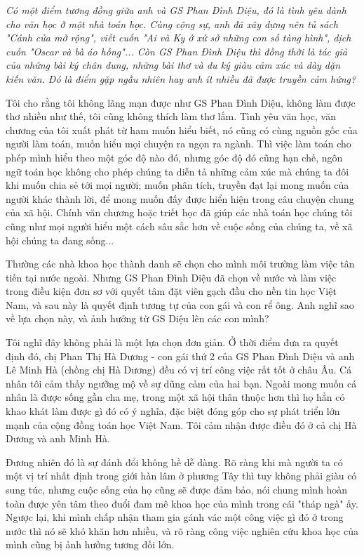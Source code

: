 \emph{
Có một điểm tương đồng giữa anh và GS Phan Đình Diệu, đó là tình yêu dành cho văn học ở một nhà toán học. Cùng cộng sự, anh đã xây dựng nên tủ sách "Cánh cửa mở rộng", viết cuốn "Ai và Ky ở xứ sở những con số tàng hình", dịch cuốn "Oscar và bà áo hồng"... Còn GS Phan Đình Diệu thì đồng thời là tác giả của những bài ký chân dung, những bài thơ và du ký giàu cảm xúc và dày dặn kiến văn. Đó là điểm gặp ngẫu nhiên hay anh ít nhiều đã được truyền cảm hứng?}

Tôi cho rằng tôi không lãng mạn được như GS Phan Đình Diệu, không làm được thơ nhiều như thế, tôi cũng không thích làm thơ lắm. Tình yêu văn học, văn chương của tôi xuất phát từ ham muốn hiểu biết, nó cũng có cùng nguồn gốc của người làm toán, muốn hiểu mọi chuyện ra ngọn ra ngành. Thì việc làm toán cho phép mình hiểu theo một góc độ nào đó, nhưng góc độ đó cũng hạn chế, ngôn ngữ toán học không cho phép chúng ta diễn tả những cảm xúc mà chúng ta đôi khi muốn chia sẻ tới mọi người; muốn phân tích, truyền đạt lại mong muốn của người khác thành lời, để mong muốn đấy được hiển hiện trong câu chuyện chung của xã hội. Chính văn chương hoặc triết học đã giúp các nhà toán học chúng tôi cũng như mọi người hiểu một cách sâu sắc hơn về cuộc sống của chúng ta, về xã hội chúng ta đang sống...

Thường các nhà khoa học thành danh sẽ chọn cho mình môi trường làm việc tân tiến tại nước ngoài. Nhưng GS Phan Đình Diệu đã chọn về nước và làm việc trong điều kiện đơn sơ với quyết tâm đặt viên gạch đầu cho nền tin học Việt Nam, và sau này là quyết định tương tự của con gái và con rể ông. Anh nghĩ sao về lựa chọn này, và ảnh hưởng từ GS Diệu lên các con mình?

Tôi nghĩ đây không phải là một lựa chọn đơn giản. Ở thời điểm đưa ra quyết định đó, chị Phan Thị Hà Dương - con gái thứ 2 của GS Phan Đình Diệu và anh Lê Minh Hà (chồng chị Hà Dương) đều có vị trí công việc rất tốt ở châu Âu. Cá nhân tôi cảm thấy ngưỡng mộ về sự dũng cảm của hai bạn. Ngoài mong muốn cá nhân là được sống gần cha mẹ, trong một xã hội thân thuộc hơn thì họ hẳn có khao khát làm được gì đó có ý nghĩa, đặc biệt đóng góp cho sự phát triển lớn mạnh của cộng đồng toán học Việt Nam. Tôi cảm nhận được điều đó ở cả chị Hà Dương và anh Minh Hà.       

Đương nhiên đó là sự đánh đổi không hề dễ dàng. Rõ ràng khi mà người ta có một vị trí nhất định trong giới hàn lâm ở phương Tây thì tuy không phải giàu có sung túc, nhưng cuộc sống của họ cũng sẽ được đảm bảo, nói chung mình hoàn toàn được yên tâm theo đuổi đam mê khoa học của mình trong cái "tháp ngà" ấy.  Ngược lại, khi mình chấp nhận tham gia gánh vác một công việc gì đó ở trong nước thì nó sẽ khó khăn hơn nhiều, và rõ ràng công việc nghiên cứu khoa học của mình cũng bị ảnh hưởng tương đối lớn.  

